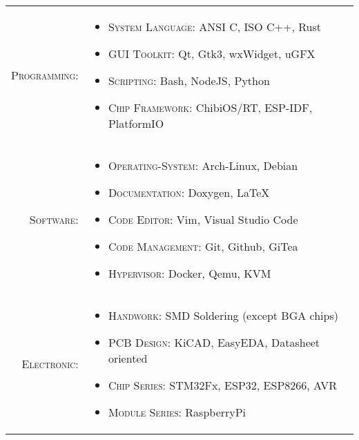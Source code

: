 %
%

\renewcommand{\arraystretch}{1.1}

\begin{tabular}{>{}r>{}p{13cm}}
    \textsc{Programming:} &
        \begin{itemize}
            \item \textsc{System Language:} ANSI C, ISO C++, Rust
            \item \textsc{GUI Toolkit:} Qt, Gtk3, wxWidget, uGFX
            \item \textsc{Scripting:} Bash, NodeJS, Python
            \item \textsc{Chip Framework:} ChibiOS/RT, ESP-IDF, PlatformIO
        \end{itemize} \\

    \textsc{Software:} &
        \begin{itemize}
            \item \textsc{Operating-System:} Arch-Linux, Debian
            \item \textsc{Documentation:} Doxygen, LaTeX
            \item \textsc{Code Editor:} Vim, Visual Studio Code
            \item \textsc{Code Management:} Git, Github, GiTea
            \item \textsc{Hypervisor:} Docker, Qemu, KVM
        \end{itemize} \\

    \textsc{Electronic:} &
        \begin{itemize}
            \item \textsc{Handwork:} SMD Soldering (except BGA chips)
            \item \textsc{PCB Design:} KiCAD, EasyEDA, Datasheet oriented
            \item \textsc{Chip Series:} STM32Fx, ESP32, ESP8266, AVR
            \item \textsc{Module Series:} RaspberryPi
        \end{itemize}
\end{tabular}

